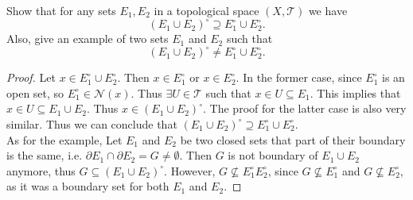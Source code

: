 \begin{problem}
	Show that for any sets $E_1, E_2$ in a topological space $(X,\mathcal{T})$ we have
	\[ (E_1 \cup E_2)^\circ \supseteq E_1^\circ \cup E_2^\circ. \]
	Also, give an example of two sets $E_1$ and $E_2$ such that 
	\[ (E_1 \cup E_2)^\circ \neq E_1^\circ \cup E_2^\circ. \]
\end{problem}
\begin{proof}
	Let $x \in E_1^\circ \cup E_2^\circ$. Then $x \in E_1^\circ$ or $x \in E_2^\circ$. In the former case, since $E_1^\circ$ is an open set, so $E_1^\circ \in \mathcal{N}(x)$. Thus $\exists U \in \mathcal{T}$ such that $x \in U \subseteq E_1$. This implies that $x\in U \subseteq E_1 \cup E_2$. Thus $x \in (E_1\cup E_2)^\circ.$ The proof for the latter case is also very similar. Thus we can conclude that $(E_1 \cup E_2)^\circ \supseteq E_1^\circ \cup E_2^\circ$. \\
	As for the example, Let $E_1$ and $E_2$ be two closed sets that part of their boundary is the same, i.e. $\partial E_1 \cap \partial E_2 = G \neq \emptyset$. Then $G$ is not boundary of $E_1 \cup E_2$ anymore, thus $G \subseteq (E_1 \cup E_2)^\circ$. However, $G \not\subseteq E_1^\circ E_2^\circ$, since $G \not\subseteq E_1^\circ$ and $G \not\subseteq E_2^\circ$, as it was a boundary set for both $E_1$ and $E_2$.
\end{proof}

